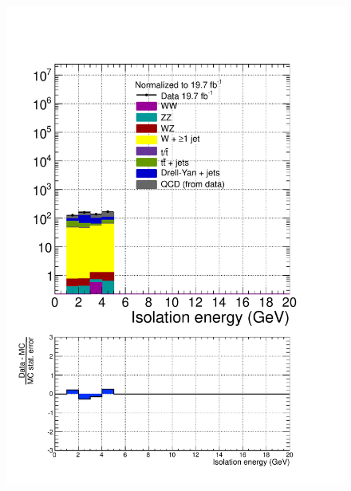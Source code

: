 \begin{figure}[hbtp]
  \begin{center}
    \includegraphics[width=\cmsFigWidth]{figures/dataVsMCQCD_tauHadIso_lowMT_v87}

\end{center}
\end{figure}
